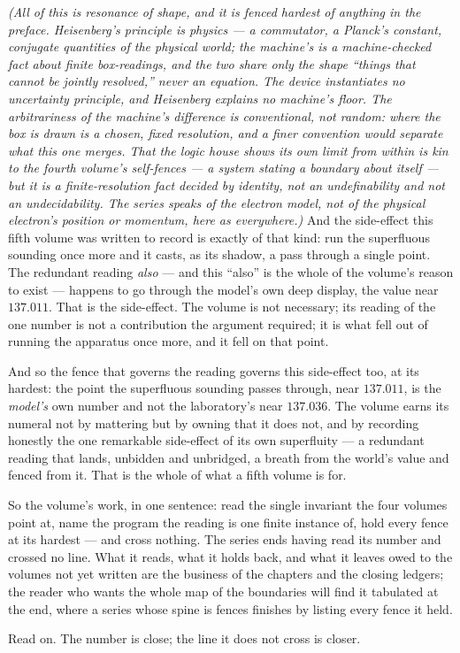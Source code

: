 \emph{(All of this is resonance of shape, and it is fenced hardest of
anything in the preface. Heisenberg's principle is physics --- a commutator,
a Planck's constant, conjugate quantities of the physical world; the
machine's is a machine-checked fact about finite box-readings, and the two
share only the shape ``things that cannot be jointly resolved,'' never an
equation. The device instantiates no uncertainty principle, and Heisenberg
explains no machine's floor. The arbitrariness of the machine's difference
is conventional, not random: where the box is drawn is a chosen, fixed
resolution, and a finer convention would separate what this one merges. That
the logic house shows its own limit from within is kin to the fourth
volume's self-fences --- a system stating a boundary about itself --- but it
is a finite-resolution fact decided by identity, not an undefinability and
not an undecidability. The series speaks of the electron model, not of the
physical electron's position or momentum, here as everywhere.)} And the
side-effect this fifth volume was written to record is exactly of that kind:
run the superfluous sounding once more and it casts, as its shadow, a pass
through a single point. The redundant reading \emph{also} --- and this
``also'' is the whole of the volume's reason to exist --- happens to go
through the model's own deep display, the value near $137.011$. That is the
side-effect. The volume is not necessary; its
reading of the one number is not a contribution the argument required; it is
what fell out of running the apparatus once more, and it fell on that point.

And so the fence that governs the reading governs this side-effect too, at
its hardest: the point the superfluous sounding passes through, near
$137.011$, is the \emph{model's} own number and not the laboratory's near
$137.036$. The volume earns its numeral not by mattering but by owning that
it does not, and by recording honestly the one remarkable side-effect of
its own superfluity --- a redundant reading that lands, unbidden and
unbridged, a breath from the world's value and fenced from it. That is the
whole of what a fifth volume is for.

So the volume's work, in one sentence: read the single invariant the four
volumes point at, name the program the reading is one finite instance of,
hold every fence at its hardest --- and cross nothing. The series ends
having read its number and crossed no line. What it reads, what it holds
back, and what it leaves owed to the volumes not yet written are the
business of the chapters and the closing ledgers; the reader who wants the
whole map of the boundaries will find it tabulated at the end, where a
series whose spine is fences finishes by listing every fence it held.

Read on. The number is close; the line it does not cross is closer.
